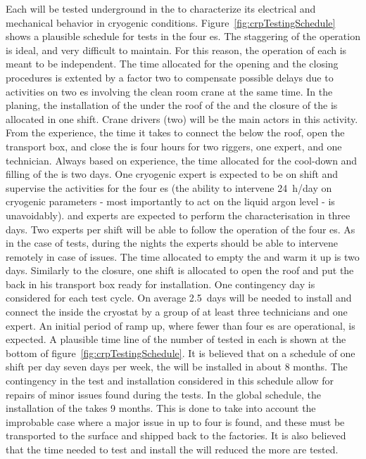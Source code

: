 Each  will be tested underground in the  \coldbox to characterize its electrical and mechanical behavior in cryogenic conditions.
Figure~\ref{fig:crpTestingSchedule} shows a plausible schedule for tests in the four  \coldbox{}es.
The staggering of the  \coldbox operation is ideal, and very difficult to maintain.
For this reason, the operation of each  \coldbox is meant to be independent.
The time allocated for the opening and the closing procedures is extented by a factor two to compensate possible delays due to activities on two  \coldbox{}es involving the clean room crane at the same time.
In the planing, the installation of the  under the roof of the  \coldbox and the closure of the  \coldbox is allocated in one shift.
Crane drivers (two) will be the main actors in this activity.
From the  experience, the time it takes to connect the  below the  \coldbox roof, open the transport box, and close the  \coldbox is four hours for two riggers, one  expert, and one technician.
Always based on  experience, the time allocated for the cool-down and filling of the  \coldbox is two days.
One cryogenic expert is expected to be on shift and supervise the activities for the four  \coldbox{}es (the ability to intervene 24~h/day on cryogenic parameters - most importantly to act on the liquid argon level - is unavoidably).
 and  experts are expected to perform the characterisation in three days.
Two experts per shift will be able to follow the operation of the four  \coldbox{}es.
As in the case of   \coldbox tests, during the nights the experts should be able to intervene remotely in case of issues.
The time allocated to empty the  \coldbox and warm it up is two days.
Similarly to the  \coldbox closure, one shift is allocated to open the roof and put the  back in his transport box ready for installation.
One contingency day is considered for each  \coldbox test cycle.
On average 2.5~days will be needed to install and connect the  inside the cryostat by a group of at least three technicians and one  expert.
An initial period of ramp up, where fewer than four  \coldbox{}es are operational, is expected.
A plausible time line of the number of  tested in each  \coldbox is shown at the bottom of figure~\ref{fig:crpTestingSchedule}.
It is believed that on a schedule of one shift per day seven days per week, the  will be installed in about 8 months.
The contingency in the test and installation considered in this schedule allow for repairs of minor issues found during the tests.
In the global schedule, the installation of the  takes 9 months.
This is done to take into account the improbable case where a major issue in up to four  is found, and these  must be transported to the surface and shipped back to the factories.
It is also believed that the time needed to test and install the  will reduced the more  are tested.

